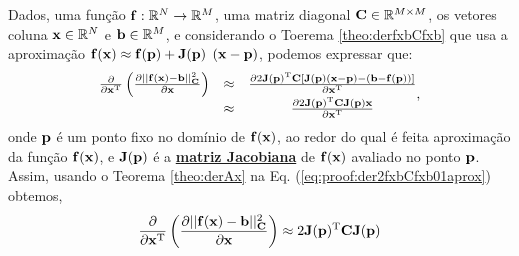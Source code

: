 \begin{myproofT}\label{proof:theo:der2fxbCfxb0aprox}
Dados,
uma função $\VECTOR{f}:\mathbb{R}^{N} \rightarrow \mathbb{R}^{M}$, 
uma matriz diagonal $\MATRIX{C}\in \mathbb{R}^{M\times M}$, 
os vetores coluna $\VECTOR{x}\in \mathbb{R}^{N}$ e 
$\VECTOR{b}\in \mathbb{R}^{M}$, e
considerando o Toerema \ref{theo:derfxbCfxb} que usa a aproximação
$\VECTOR{f}(\VECTOR{x})\approx \VECTOR{f}(\VECTOR{p}) + \MATRIX{J}(\VECTOR{p})$ $\left(\VECTOR{x}-\VECTOR{p}\right)$,
podemos expressar que:
\begin{equation}\label{eq:proof:der2fxbCfxb01aprox}
\begin{matrix}
\frac{\partial }{\partial \VECTOR{x}^{\transpose}}\left( \frac{\partial ||\VECTOR{f}(\VECTOR{x})-\VECTOR{b}||_{\MATRIX{C}}^2}{\partial \VECTOR{x}} \right) & \approx & 
\frac{\partial 2 \MATRIX{J}(\VECTOR{p})^{\transpose}\MATRIX{C}\left[\MATRIX{J}(\VECTOR{p})\left(\VECTOR{x} - \VECTOR{p}\right)-\left(\VECTOR{b}-\VECTOR{f}(\VECTOR{p})\right)\right]}{\partial \VECTOR{x}^{\transpose}} \\
~ & \approx & \frac{\partial 2 \MATRIX{J}(\VECTOR{p})^{\transpose}\MATRIX{C} \MATRIX{J}(\VECTOR{p})\VECTOR{x}  }{\partial \VECTOR{x}^{\transpose}}
\end{matrix},
\end{equation}
onde $\VECTOR{p}$ é um ponto fixo no domínio de $\VECTOR{f}(\VECTOR{x})$,  ao redor do qual é feita  aproximação
da função $\VECTOR{f}(\VECTOR{x})$,
e $\MATRIX{J}(\VECTOR{p})$ é a \hyperref[def:jacobian]{\textbf{matriz Jacobiana}} de $\VECTOR{f}(\VECTOR{x})$ avaliado no ponto $\VECTOR{p}$.
Assim, usando o Teorema \ref{theo:derAx} na Eq. (\ref{eq:proof:der2fxbCfxb01aprox})
obtemos,
\begin{equation}\label{eq:proof:der2fxbCfxb01aprox2}
\frac{\partial }{\partial \VECTOR{x}^{\transpose}}\left( \frac{\partial ||\VECTOR{f}(\VECTOR{x})-\VECTOR{b}||_{\MATRIX{C}}^2}{\partial \VECTOR{x}} \right) \approx 
2 \MATRIX{J}(\VECTOR{p})^{\transpose}\MATRIX{C} \MATRIX{J}(\VECTOR{p}) 
\end{equation}
\end{myproofT}

